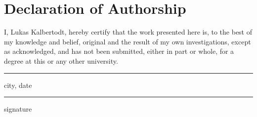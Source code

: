 \chapter*{Declaration of Authorship}
\thispagestyle{empty}

I, Lukas Kalbertodt, hereby certify that the work presented here is, to the best of my knowledge and belief, original and the result of my own investigations, except as acknowledged, and has not been submitted, either in part or whole, for a degree at this or any other university.

\vspace*{4cm}

\noindent
\begin{minipage}{6.5cm}
    \hrule{}
    \vspace*{.3cm}
    city, date
\end{minipage}
\begin{minipage}{2cm}
\hfill
\end{minipage}
\begin{minipage}{6.5cm}
    \hrule{}
    \vspace*{.3cm}
    signature
\end{minipage}
